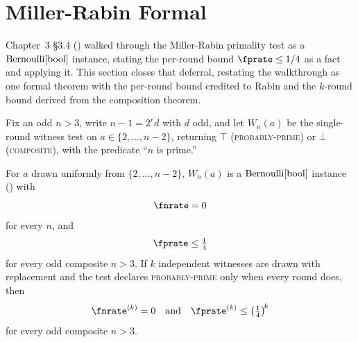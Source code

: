%

\section{Miller-Rabin Formal}
\label{sec:miller-rabin-formal}

Chapter~3 \S3.4 () walked through the Miller-Rabin
primality test as a $\mathrm{Bernoulli}[\mathrm{bool}]$ instance, stating the per-round
bound $\fprate \le 1/4$ as a fact and applying it. This section closes that
deferral, restating the walkthrough as one formal theorem with the per-round
bound credited to Rabin and the $k$-round bound derived from the composition
theorem.

Fix an odd $n > 3$, write $n - 1 = 2^r d$ with $d$ odd, and let $W_n(a)$ be the
single-round witness test on $a \in \{2, \ldots, n-2\}$, returning $\top$
(\textsc{probably-prime}) or $\bot$ (\textsc{composite}), with the predicate
``$n$ is prime.''

\begin{theorem}
\label{thm:miller-rabin-formal}
For $a$ drawn uniformly from $\{2, \ldots, n-2\}$, $W_n(a)$ is a
$\mathrm{Bernoulli}[\mathrm{bool}]$ instance () with
\begin{equation}
\label{eq:mr-formal-fnr}
  \fnrate = 0
\end{equation}
for every $n$, and
\begin{equation}
\label{eq:mr-formal-fpr}
  \fprate \le \tfrac14
\end{equation}
for every odd composite $n > 3$. If $k$ independent witnesses are drawn with
replacement and the test declares \textsc{probably-prime} only when every round
does, then
\begin{equation}
\label{eq:mr-formal-k-round}
  \fnrate^{(k)} = 0
  \quad\text{and}\quad
  \fprate^{(k)} \le \left(\tfrac14\right)^{\!k}
\end{equation}
for every odd composite $n > 3$.
\end{theorem}

